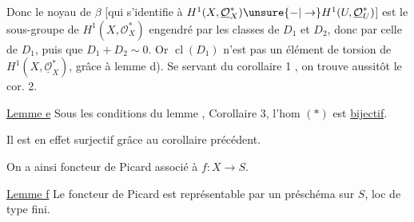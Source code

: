 
Donc le noyau de $\beta$ [qui s'identifie à $H^1(X,\underline{\mathcal O}_X^*)\unsure{-|\to}H^1(U,\underline{\mathcal O}_U^*)$] est le sous-groupe de $H^1(X,\mathcal O_X^*)$ engendré par les classes de $D_1$ et $D_2$, donc par celle de $D_1$, puis que $D_1+D_2\sim0$.  Or $\operatorname{cl}(D_1)$ n'est pas un élément de torsion de $H^1(X,\underline{\mathcal O}_X^*)$, grâce à lemme d). Se servant du corollaire 1 , on trouve aussitôt le cor. 2.

\uline{Lemme e} Sous les conditions du lemme , Corollaire 3, l'hom $(*)$ est \uline{bijectif}.

Il est en effet surjectif grâce au corollaire précédent.

On a ainsi   foncteur de Picard associé à $f:X\to S$.

\uline{Lemme f} Le foncteur  de Picard est  représentable par un préschéma sur $S$, loc de type fini.


